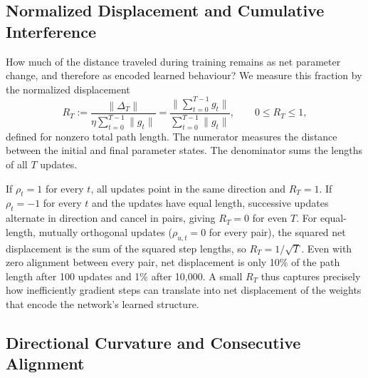 \subsection{Normalized Displacement and Cumulative Interference}
\label{subsec:normalized-displacement}

How much of the distance traveled during training remains as net parameter change, and therefore as encoded learned behaviour? We measure this fraction by the normalized displacement
\begin{equation}
  R_T:=
  \frac{\|\Delta_T\|}
       {\eta\sum_{t=0}^{T-1}\|g_t\|}
  =\frac{\|\sum_{t=0}^{T-1} g_t\|}
        {\sum_{t=0}^{T-1}\|g_t\|},
  \qquad 0\leq R_T\leq1,
  \label{eq:normalized-displacement}
\end{equation}
defined for nonzero total path length. The numerator measures the distance between the initial and final parameter states. The denominator sums the lengths of all $T$ updates.

If $\rho_t=1$ for every $t$, all updates point in the same direction and $R_T=1$. If $\rho_t=-1$ for every $t$ and the updates have equal length, successive updates alternate in direction and cancel in pairs, giving $R_T=0$ for even $T$. For equal-length, mutually orthogonal updates ($\rho_{u,t}=0$ for every pair), the squared net displacement is the sum of the squared step lengths, so $R_T=1/\sqrt{T}$. Even with zero alignment between every pair, net displacement is only 10\% of the path length after 100 updates and 1\% after 10,000. A small $R_T$ thus captures precisely how inefficiently gradient steps can translate into net displacement of the weights that encode the network's learned structure.

\subsection{Directional Curvature and Consecutive Alignment}
\label{subsec:curvature}

